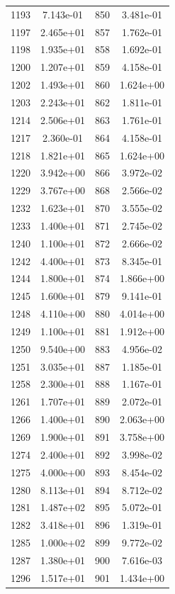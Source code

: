 \documentclass[12pt]{article}
\begin{document}
\begin{longtable}{@{}cccc@{}}
1193 & 7.143e-01 & 850 & 3.481e-01 \\
1197 & 2.465e+01 & 857 & 1.762e-01 \\
1198 & 1.935e+01 & 858 & 1.692e-01 \\
1200 & 1.207e+01 & 859 & 4.158e-01 \\
1202 & 1.493e+01 & 860 & 1.624e+00 \\
1203 & 2.243e+01 & 862 & 1.811e-01 \\
1214 & 2.506e+01 & 863 & 1.761e-01 \\
1217 & 2.360e-01 & 864 & 4.158e-01 \\
1218 & 1.821e+01 & 865 & 1.624e+00 \\
1220 & 3.942e+00 & 866 & 3.972e-02 \\
1229 & 3.767e+00 & 868 & 2.566e-02 \\
1232 & 1.623e+01 & 870 & 3.555e-02 \\
1233 & 1.400e+01 & 871 & 2.745e-02 \\
1240 & 1.100e+01 & 872 & 2.666e-02 \\
1242 & 4.400e+01 & 873 & 8.345e-01 \\
1244 & 1.800e+01 & 874 & 1.866e+00 \\
1245 & 1.600e+01 & 879 & 9.141e-01 \\
1248 & 4.110e+00 & 880 & 4.014e+00 \\
1249 & 1.100e+01 & 881 & 1.912e+00 \\
1250 & 9.540e+00 & 883 & 4.956e-02 \\
1251 & 3.035e+01 & 887 & 1.185e-01 \\
1258 & 2.300e+01 & 888 & 1.167e-01 \\
1261 & 1.707e+01 & 889 & 2.072e-01 \\
1266 & 1.400e+01 & 890 & 2.063e+00 \\
1269 & 1.900e+01 & 891 & 3.758e+00 \\
1274 & 2.400e+01 & 892 & 3.998e-02 \\
1275 & 4.000e+00 & 893 & 8.454e-02 \\
1280 & 8.113e+01 & 894 & 8.712e-02 \\
1281 & 1.487e+02 & 895 & 5.072e-01 \\
1282 & 3.418e+01 & 896 & 1.319e-01 \\
1285 & 1.000e+02 & 899 & 9.772e-02 \\
1287 & 1.380e+01 & 900 & 7.616e-03 \\
1296 & 1.517e+01 & 901 & 1.434e+00 \\

\bottomrule
\end{longtable}
\end{document}
